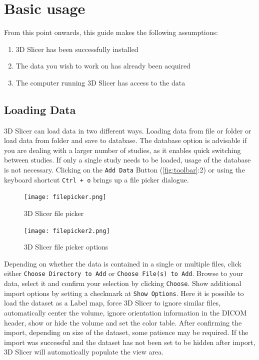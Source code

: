 \section{Basic usage}
\noindent
From this point onwards, this guide makes the following assumptions:
\begin{enumerate}
	\item 3D Slicer has been successfully installed
	\item The data you wish to work on has already been acquired
	\item The computer running 3D Slicer has access to the data
\end{enumerate}

\subsection{Loading Data}
3D Slicer can load data in two different ways.
Loading data from file or folder or load data from folder and save to database. %
The database option is advisable if you are dealing with a larger number of studies, as it enables quick switching between studies.
If only a single study needs to be loaded, usage of the database is not necessary.
Clicking on the \texttt{Add Data} Button (\ref{fig:toolbar}:2) or using the keyboard shortcut \texttt{Ctrl + o} brings up a file picker dialogue.
\begin{figure}[h!]
	\centerline{
		\texttt{[image: filepicker.png]}}
	\caption{3D Slicer file picker}\label{fig:filepicker}
\end{figure}

\begin{figure}[h!]
	\centerline{
		\texttt{[image: filepicker2.png]}}
	\caption{3D Slicer file picker options}\label{fig:filepicker2}
\end{figure}
\noindent
Depending on whether the data is contained in a single or multiple files, click either \texttt{Choose Directory to Add} or \texttt{Choose File(s) to Add}. Browse to your data, select it and confirm your selection by clicking \texttt{Choose}.
Show additional import options by setting a checkmark at \texttt{Show Options}.
Here it is possible to load the dataset as a Label map, force 3D Slicer to ignore similar files, automatically center the volume, ignore orientation information in the DICOM header, show or hide the volume and set the color table.
After confirming the import, depending on size of the dataset, some patience may be required. If the import was successful and the dataset has not been set to be hidden after import, 3D Slicer will automatically populate the view area.

